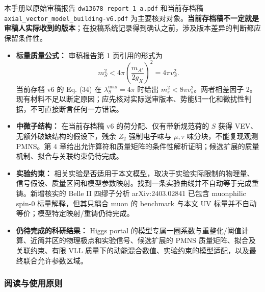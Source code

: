 \documentclass[
]{article}
\providecommand{\tightlist}{%
  \setlength{\itemsep}{0pt}\setlength{\parskip}{0pt}}
\begin{document}
本手册以原始审稿报告 \texttt{dw13678\_report\_1\_a.pdf} 和当前存档稿
\texttt{axial\_vector\_model\_building-v6.pdf}
为主要核对对象。\textbf{当前存档稿不一定就是审稿人实际收到的版本}；在投稿系统记录得到确认之前，涉及版本差异的判断都应保留条件性。

\begin{itemize}
\tightlist
\item
  \textbf{标量质量公式：} 审稿报告第 1 页引用的形式为
  \[m_S^2<4\pi\left(\frac{m_{A'}}{2g_X}\right)^2=4\pi v_S^2.\] 当前存档
  v6 的 Eq. (34) 在 \(\lambda_S^{\max}=4\pi\) 时给出
  \(m_s^2<8\pi v_s^2\)。两者相差因子
  2。现有材料不足以断定原因；应先核对实际送审版本、势能归一化和微扰性判据，不可直接断言任何一方错误。
\item
  \textbf{中微子结构：} 在当前存档稿 v6 的荷分配、仅有带新规范荷的 \(S\)
  获得 VEV、无额外破缺结构的假设下，残余 \(Z_2\) 强制电子味与
  \(\mu,\tau\) 味分块，不能复现观测 PMNS。第 4
  章给出允许算符和质量矩阵的条件性解析证明；候选扩展的质量机制、拟合与关联约束仍待完成。
\item
  \textbf{实验约束：}
  相关实验是否适用于本文模型，取决于实验实际限制的物理量、信号假设、质量区间和模型参数映射。找到一条实验曲线并不自动等于完成重铸。新增核实的
  Belle II 四缪子分析 arXiv:2403.02841 已包含 muonphilic spin-0
  标量解释，但其只耦合 muon 的 benchmark 与本文 UV
  标量并不自动等价；模型特定映射/重铸仍待完成。
\item
  \textbf{仍待完成的科研结果：} Higgs portal
  的模型专属一圈系数与重整化/阈值计算、近简并区的物理极点和实验信号、候选扩展的
  PMNS 质量矩阵、拟合及关联约束、有限 VLL
  质量下的动能混合数值、实验约束的模型适配，以及最终联合允许参数区域。
\end{itemize}

\subsubsection{阅读与使用原则}\label{ux9605ux8bfbux4e0eux4f7fux7528ux539fux5219}
\end{document}
